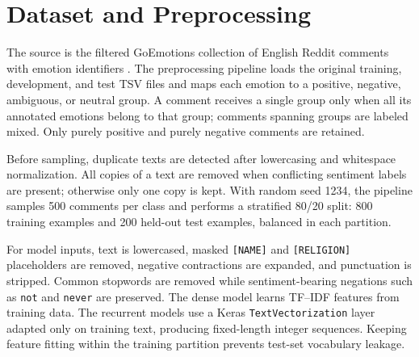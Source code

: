 \section{Dataset and Preprocessing}
The source is the filtered GoEmotions collection of English Reddit comments with emotion identifiers \cite{demszky2020goemotions}. The preprocessing pipeline loads the original training, development, and test TSV files and maps each emotion to a positive, negative, ambiguous, or neutral group. A comment receives a single group only when all its annotated emotions belong to that group; comments spanning groups are labeled mixed. Only purely positive and purely negative comments are retained.

Before sampling, duplicate texts are detected after lowercasing and whitespace normalization. All copies of a text are removed when conflicting sentiment labels are present; otherwise only one copy is kept. With random seed 1234, the pipeline samples 500 comments per class and performs a stratified 80/20 split: 800 training examples and 200 held-out test examples, balanced in each partition.

For model inputs, text is lowercased, masked \texttt{[NAME]} and \texttt{[RELIGION]} placeholders are removed, negative contractions are expanded, and punctuation is stripped. Common stopwords are removed while sentiment-bearing negations such as \texttt{not} and \texttt{never} are preserved. The dense model learns TF--IDF features from training data. The recurrent models use a Keras \texttt{TextVectorization} layer adapted only on training text, producing fixed-length integer sequences. Keeping feature fitting within the training partition prevents test-set vocabulary leakage.
